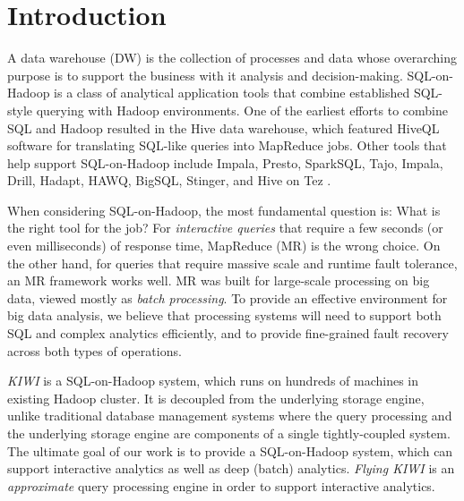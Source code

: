 \documentclass{sig-alternate-05-2015}
\begin{document}


%
%

%
%
\printccsdesc



\section{Introduction}
A data warehouse (DW) is the collection of processes and data whose overarching purpose is to support the business with it analysis and decision-making. 
SQL-on-Hadoop is a class of analytical application tools that combine established SQL-style querying with Hadoop environments.
One of the earliest efforts to combine SQL and Hadoop resulted in the Hive data warehouse, which featured HiveQL software for translating SQL-like queries into MapReduce jobs. Other tools that help support SQL-on-Hadoop include Impala, Presto, SparkSQL, Tajo, Impala, Drill, Hadapt, HAWQ, BigSQL, Stinger, and Hive on Tez \cite{Babcock:2003, Chaudhuri:2007, Zeng:2015, Floratou:2014, Agarwal:2014, Agarwal:2013}.

When considering SQL-on-Hadoop, the most fundamental question is: What is the right tool for the job? For \textit{interactive queries} that require a few seconds (or even milliseconds) of response time, MapReduce (MR) is the wrong choice. On the other hand, for queries that require massive scale and runtime fault tolerance, an MR framework works well. MR was built for large-scale processing on big data, viewed mostly as \textit{batch processing}.
To provide an effective environment for big data analysis, we believe that processing systems will need to support both SQL and complex analytics efficiently, and to provide fine-grained fault recovery across both types of operations.

\textit{KIWI} is a  SQL-on-Hadoop system, which runs on hundreds of machines in existing Hadoop cluster.
It is decoupled from the underlying storage engine, unlike traditional database management systems where the query processing and the underlying storage engine are components of a single tightly-coupled system.
The ultimate goal of our work is to provide a SQL-on-Hadoop system, which can support interactive analytics as well as deep (batch) analytics. \textit{Flying KIWI} is an \textit{approximate} query processing engine in order to support interactive analytics.
\end{document}
